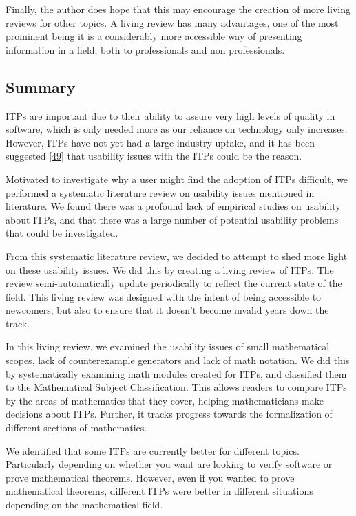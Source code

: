 \documentclass[
]{article}
\begin{document}
Finally, the author does hope that this may encourage the creation of
more living reviews for other topics. A living review has many
advantages, one of the most prominent being it is a considerably more
accessible way of presenting information in a field, both to
professionals and non professionals.

\hypertarget{summary}{%
\subsection{Summary}\label{summary}}

ITPs are important due to their ability to assure very high levels of
quality in software, which is only needed more as our reliance on
technology only increases. However, ITPs have not yet had a large
industry uptake, and it has been suggested
{[}\protect\hyperlink{ref-kadoda_formal_1997}{49}{]} that usability
issues with the ITPs could be the reason.

Motivated to investigate why a user might find the adoption of ITPs
difficult, we performed a systematic literature review on usability
issues mentioned in literature. We found there was a profound lack of
empirical studies on usability about ITPs, and that there was a large
number of potential usability problems that could be investigated.

From this systematic literature review, we decided to attempt to shed
more light on these usability issues. We did this by creating a living
review of ITPs. The review semi-automatically update periodically to
reflect the current state of the field. This living review was designed
with the intent of being accessible to newcomers, but also to ensure
that it doesn't become invalid years down the track.

In this living review, we examined the usability issues of small
mathematical scopes, lack of counterexample generators and lack of math
notation. We did this by systematically examining math modules created
for ITPs, and classified them to the Mathematical Subject
Classification. This allows readers to compare ITPs by the areas of
mathematics that they cover, helping mathematicians make decisions about
ITPs. Further, it tracks progress towards the formalization of different
sections of mathematics.

We identified that some ITPs are currently better for different topics.
Particularly depending on whether you want are looking to verify
software or prove mathematical theorems. However, even if you wanted to
prove mathematical theorems, different ITPs were better in different
situations depending on the mathematical field.
\end{document}

